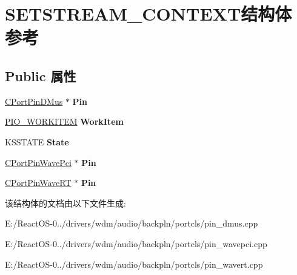 \hypertarget{struct_s_e_t_s_t_r_e_a_m___c_o_n_t_e_x_t}{}\section{S\+E\+T\+S\+T\+R\+E\+A\+M\+\_\+\+C\+O\+N\+T\+E\+X\+T结构体 参考}
\label{struct_s_e_t_s_t_r_e_a_m___c_o_n_t_e_x_t}
\subsection*{Public 属性}
\begin{DoxyCompactItemize}
\item 
\mbox{\label{struct_s_e_t_s_t_r_e_a_m___c_o_n_t_e_x_t_a986ff80777adcff23f76f0d1e5177ba4}} 
\hyperlink{class_c_port_pin_d_mus}{C\+Port\+Pin\+D\+Mus} $\ast$ {\bfseries Pin}
\item 
\mbox{\label{struct_s_e_t_s_t_r_e_a_m___c_o_n_t_e_x_t_ae25b8f419922e7c99c49eb062eb77aa6}} 
\hyperlink{struct___i_o___w_o_r_k_i_t_e_m}{P\+I\+O\+\_\+\+W\+O\+R\+K\+I\+T\+EM} {\bfseries Work\+Item}
\item 
\mbox{\label{struct_s_e_t_s_t_r_e_a_m___c_o_n_t_e_x_t_a4de904959ee1d67041844e316c96d4c6}} 
K\+S\+S\+T\+A\+TE {\bfseries State}
\item 
\mbox{\label{struct_s_e_t_s_t_r_e_a_m___c_o_n_t_e_x_t_afce5935fb87e07b8fa23d99669169a25}} 
\hyperlink{class_c_port_pin_wave_pci}{C\+Port\+Pin\+Wave\+Pci} $\ast$ {\bfseries Pin}
\item 
\mbox{\label{struct_s_e_t_s_t_r_e_a_m___c_o_n_t_e_x_t_af4145c304d294f34055a594b1f8a09c7}} 
\hyperlink{class_c_port_pin_wave_r_t}{C\+Port\+Pin\+Wave\+RT} $\ast$ {\bfseries Pin}
\end{DoxyCompactItemize}


该结构体的文档由以下文件生成\+:\begin{DoxyCompactItemize}
\item 
E\+:/\+React\+O\+S-\/0../drivers/wdm/audio/backpln/portcls/pin\+\_\+dmus.\+cpp\item 
E\+:/\+React\+O\+S-\/0../drivers/wdm/audio/backpln/portcls/pin\+\_\+wavepci.\+cpp\item 
E\+:/\+React\+O\+S-\/0../drivers/wdm/audio/backpln/portcls/pin\+\_\+wavert.\+cpp\end{DoxyCompactItemize}
